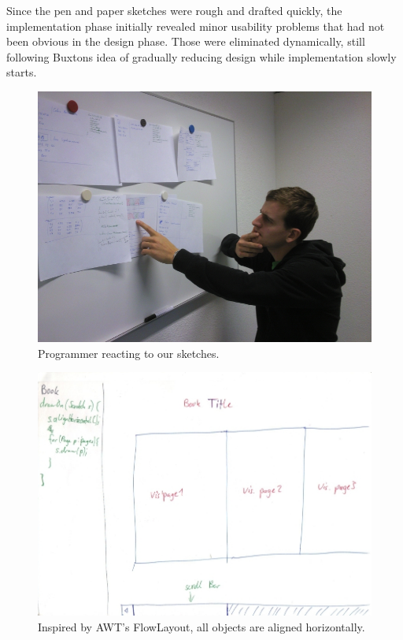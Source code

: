 \documentclass[english]{scrartcl}
\begin{document}
Since the pen and paper sketches were rough and drafted quickly, the implementation phase initially revealed minor usability problems that had not been obvious in the design phase.
Those were eliminated dynamically, still following Buxtons idea of gradually reducing design while implementation slowly starts.

\begin{figure}[h]
	\includegraphics[width=\linewidth]{img/design-sketches_thinker.jpg}
	\caption[Confronting people with design sketches]{Programmer reacting to our sketches.}
\end{figure}

\begin{figure}[h]
	\includegraphics[width=\linewidth]{img/sketches/032.jpg}
	\caption[Bad sketch example: Horizontal and vertical alignment]{Inspired by AWT's FlowLayout, all objects are aligned horizontally.}
\end{figure}
\end{document}
